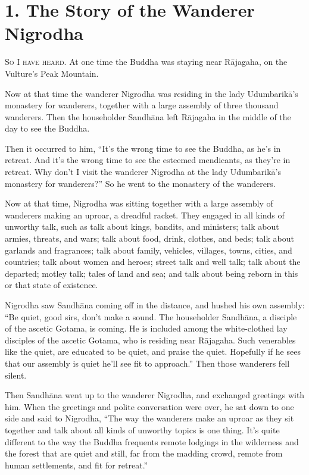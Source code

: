 \documentclass[12pt,openany]{book}%
\newcommand*{\scevam}[1]{\textsc{#1}}
\begin{document}
\section*{1. The Story of the Wanderer Nigrodha }

\scevam{So I have heard. }At one time the Buddha was staying near \textsanskrit{Rājagaha}, on the Vulture’s Peak Mountain. 

Now at that time the wanderer Nigrodha was residing in the lady \textsanskrit{Udumbarikā}’s monastery for wanderers, together with a large assembly of three thousand wanderers. Then the householder \textsanskrit{Sandhāna} left \textsanskrit{Rājagaha} in the middle of the day to see the Buddha. 

Then it occurred to him, “It’s the wrong time to see the Buddha, as he’s in retreat. And it’s the wrong time to see the esteemed mendicants, as they’re in retreat. Why don’t I visit the wanderer Nigrodha at the lady \textsanskrit{Udumbarikā}’s monastery for wanderers?” So he went to the monastery of the wanderers. 

Now at that time, Nigrodha was sitting together with a large assembly of wanderers making an uproar, a dreadful racket. They engaged in all kinds of unworthy talk, such as talk about kings, bandits, and ministers; talk about armies, threats, and wars; talk about food, drink, clothes, and beds; talk about garlands and fragrances; talk about family, vehicles, villages, towns, cities, and countries; talk about women and heroes; street talk and well talk; talk about the departed; motley talk; tales of land and sea; and talk about being reborn in this or that state of existence. 

Nigrodha saw \textsanskrit{Sandhāna} coming off in the distance, and hushed his own assembly: “Be quiet, good sirs, don’t make a sound. The householder \textsanskrit{Sandhāna}, a disciple of the ascetic Gotama, is coming. He is included among the white-clothed lay disciples of the ascetic Gotama, who is residing near \textsanskrit{Rājagaha}. Such venerables like the quiet, are educated to be quiet, and praise the quiet. Hopefully if he sees that our assembly is quiet he’ll see fit to approach.” Then those wanderers fell silent. 

Then \textsanskrit{Sandhāna} went up to the wanderer Nigrodha, and exchanged greetings with him. When the greetings and polite conversation were over, he sat down to one side and said to Nigrodha, “The way the wanderers make an uproar as they sit together and talk about all kinds of unworthy topics is one thing. It’s quite different to the way the Buddha frequents remote lodgings in the wilderness and the forest that are quiet and still, far from the madding crowd, remote from human settlements, and fit for retreat.” 
\end{document}
